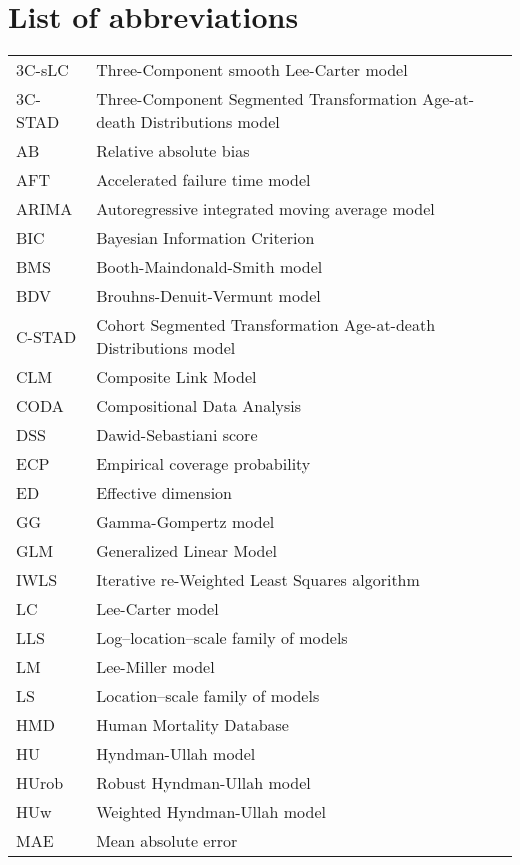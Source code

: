 \documentclass[Thesis]{subfiles}
\begin{document}
\newpage

\chapter*{List of abbreviations}

\begin{table}[h]
	\begin{tabular}{p{2cm}l}
		3C-sLC & Three-Component smooth Lee-Carter model\\
		3C-STAD & Three-Component Segmented Transformation Age-at-death Distributions model\\
		AB & Relative absolute bias\\
		AFT & Accelerated failure time model\\
		ARIMA & Autoregressive integrated moving average model\\
		BIC & Bayesian Information Criterion \\
		BMS & Booth-Maindonald-Smith model\\
		BDV & Brouhns-Denuit-Vermunt model\\
		C-STAD & Cohort Segmented Transformation Age-at-death Distributions model\\
		CLM & Composite Link Model\\
		CODA & Compositional Data Analysis\\
		DSS & Dawid-Sebastiani score\\
		ECP & Empirical coverage probability\\
		ED & Effective dimension\\
		GG & Gamma-Gompertz model\\
		GLM & Generalized Linear Model\\
		IWLS & Iterative re-Weighted Least Squares algorithm \\
		LC & Lee-Carter model\\
		LLS & Log--location--scale family of models\\
		LM & Lee-Miller model\\
		LS & Location--scale family of models\\
		HMD & Human Mortality Database\\
		HU & Hyndman-Ullah model\\
		HUrob & Robust Hyndman-Ullah model\\
		HUw & Weighted Hyndman-Ullah model\\
		MAE & Mean absolute error\\

\end{tabular}
\end{table}
\end{document}
